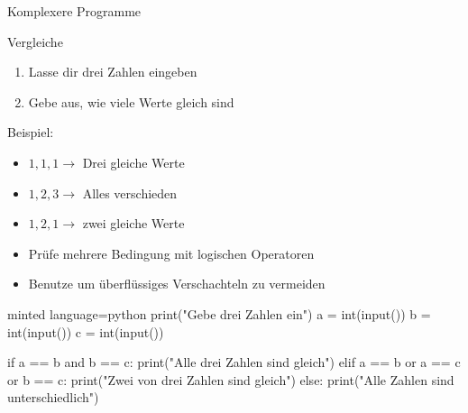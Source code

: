 \begin{task}{Komplexere Programme}
    \begin{subtask*}{Vergleiche}
        \begin{enumerate}
            \item Lasse dir drei Zahlen eingeben
            \item Gebe aus, wie viele Werte gleich sind
        \end{enumerate}

        Beispiel:
        \begin{itemize}
            \item $1, 1, 1 \to$ Drei gleiche Werte
            \item $1, 2, 3 \to$ Alles verschieden
            \item $1, 2, 1 \to$ zwei gleiche Werte
        \end{itemize}

        \begin{hinweise}
            \begin{itemize}
                \item Prüfe mehrere Bedingung mit logischen Operatoren
                \item Benutze  um überflüssiges
                    Verschachteln zu vermeiden
            \end{itemize}
        \end{hinweise}

        \begin{solution}
            \begin{codeBlock}[]{minted language=python}
                print("Gebe drei Zahlen ein")
                a = int(input())
                b = int(input())
                c = int(input())

                if a == b and b == c:
                    print("Alle drei Zahlen sind gleich")
                elif a == b or a == c or b == c:
                    print("Zwei von drei Zahlen sind gleich")
                else:
                    print("Alle Zahlen sind unterschiedlich")
            \end{codeBlock}
        \end{solution}
    \end{subtask*}
\end{task}


